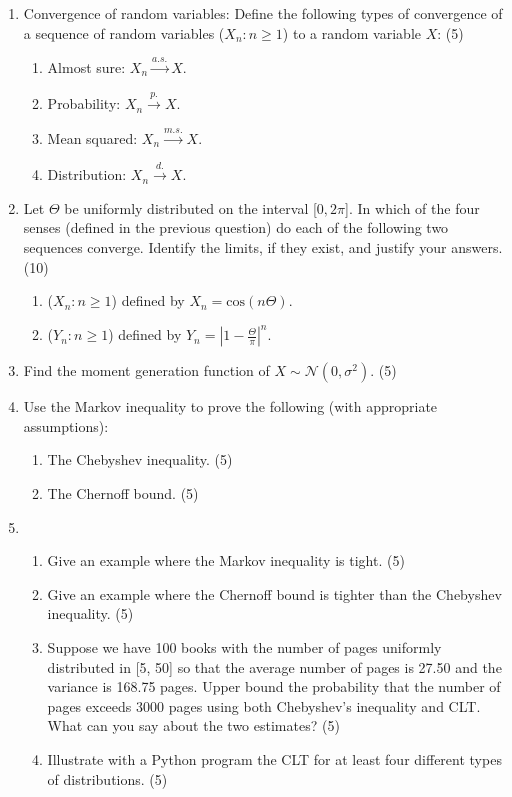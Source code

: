 \documentclass[journal,12pt,twocolumn]{IEEEtran}
\begin{document}
\begin{enumerate}
\item{{{Convergence of random variables:}} Define the following types of convergence of a sequence of random variables ($X_n: n\geq 1$) to a random variable $X$: (5)
\begin{enumerate}
\item{Almost sure: $X_n \xrightarrow {a.s.} X$.}
\item{Probability: $X_n \xrightarrow {p.} X$.}
\item{Mean squared: $X_n \xrightarrow {m.s.} X$.}
\item{Distribution: $X_n \xrightarrow {d.} X$.}
\end{enumerate}
}
\item{Let $\Theta$ be uniformly distributed on the interval [$0, 2\pi$]. In which of the four senses (defined in the previous question) do each of the following two sequences converge. Identify the limits, if they exist, and justify your answers. (10)
\begin{enumerate}
\item{($X_n: n\geq 1$) defined by $X_n = \text{cos}(n\Theta)$.}
\item{($Y_n: n\geq 1$) defined by $Y_n = |1 - \frac{\Theta}{\pi}|^n$.}
\end{enumerate}
}
\item{Find the moment generation function of $X \sim \mathcal{N}(0, \sigma^2)$. (5)}
\item{Use the Markov inequality to prove the following (with appropriate assumptions):
\begin{enumerate}
\item{The Chebyshev inequality. (5)}
\item{The Chernoff bound. (5)}
\end{enumerate}
}
\item{\begin{enumerate}
\item{Give an example where the Markov inequality is tight. (5)}
\item{Give an example where the Chernoff bound is tighter than the Chebyshev inequality. (5)}
\item{Suppose we have 100 books with the number of pages uniformly distributed in [5, 50] so that the average number of pages is 27.50 and the variance is 168.75 pages. Upper bound the probability that the number of pages exceeds 3000 pages using both Chebyshev's inequality and CLT. What can you say about the two estimates? (5)}
\item{Illustrate with a Python program the CLT for at least four different types of distributions. (5)}

\end{enumerate}}
\end{enumerate}
\end{document}
